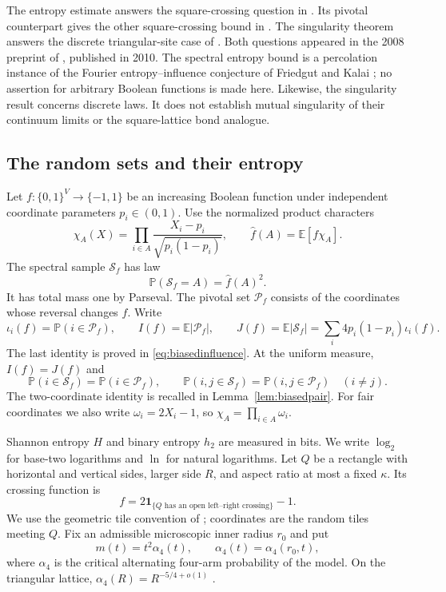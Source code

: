 \documentclass[11pt]{amsart}
\theoremstyle{remark}
\newcommand{\Prob}{\mathbb P}
\newcommand{\E}{\mathbb E}
\newcommand{\one}{\mathbf 1}
\newcommand{\cS}{\mathcal S}
\newcommand{\cP}{\mathcal P}
\begin{document}
The entropy estimate answers the square-crossing question in \cite[Section~11, Question~1]{GPS}. Its pivotal counterpart gives the other square-crossing bound in \cite[Conjecture~8]{Kalai}. The singularity theorem answers the discrete triangular-site case of \cite[Section~11, Question~5]{GPS}. Both questions appeared in the 2008 preprint of \cite{GPS}, published in 2010. The spectral entropy bound is a percolation instance of the Fourier entropy--influence conjecture of Friedgut and Kalai \cite{FK}; no assertion for arbitrary Boolean functions is made here. Likewise, the singularity result concerns discrete laws. It does not establish mutual singularity of their continuum limits or the square-lattice bond analogue.

\subsection{The random sets and their entropy}

Let $f:\{0,1\}^V\to\{-1,1\}$ be an increasing Boolean function under independent coordinate parameters $p_i\in(0,1)$. Use the normalized product characters
\[
 \chi_A(X)=\prod_{i\in A}\frac{X_i-p_i}{\sqrt{p_i(1-p_i)}},
 \qquad \widehat f(A)=\E[f\chi_A].
\]
The spectral sample $\cS_f$ has law
\begin{equation}\label{eq:spectral}
 \Prob(\cS_f=A)=\widehat f(A)^2.
\end{equation}
It has total mass one by Parseval. The pivotal set $\cP_f$ consists of the coordinates whose reversal changes $f$. Write
\[
 \iota_i(f)=\Prob(i\in\cP_f),\qquad
 I(f)=\E|\cP_f|,\qquad
 J(f)=\E|\cS_f|=\sum_i4p_i(1-p_i)\iota_i(f).
\]
The last identity is proved in \eqref{eq:biasedinfluence}. At the uniform measure, $I(f)=J(f)$ and
\begin{equation}\label{eq:jointmarginals}
 \Prob(i\in\cS_f)=\Prob(i\in\cP_f),\qquad
 \Prob(i,j\in\cS_f)=\Prob(i,j\in\cP_f)\quad(i\ne j).
\end{equation}
The two-coordinate identity is recalled in Lemma~\ref{lem:biasedpair}. For fair coordinates we also write $\omega_i=2X_i-1$, so $\chi_A=\prod_{i\in A}\omega_i$.

Shannon entropy $H$ and binary entropy $h_2$ are measured in bits. We write $\log_2$ for base-two logarithms and $\ln$ for natural logarithms. Let $Q$ be a rectangle with horizontal and vertical sides, larger side $R$, and aspect ratio at most a fixed $\kappa$. Its crossing function is
\[
 f=2\one_{\{Q\text{ has an open left--right crossing}\}}-1.
\]
We use the geometric tile convention of \cite[Section~2.1]{GPS}; coordinates are the random tiles meeting $Q$. Fix an admissible microscopic inner radius $r_0$ and put
\[
 m(t)=t^2\alpha_4(t),\qquad \alpha_4(t)=\alpha_4(r_0,t),
\]
where $\alpha_4$ is the critical alternating four-arm probability of the model. On the triangular lattice, $\alpha_4(R)=R^{-5/4+o(1)}$ \cite{SW}.
\end{document}
